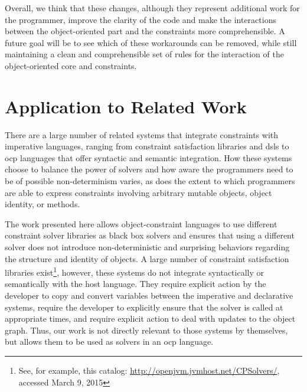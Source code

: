 \documentclass[10pt,reprint]{sigplanconf-preprint}
\def\ab#1{\todo[size=\footnotesize,color=red!40]{\textsf{AB: #1}}}
\def\tf#1{\todo[size=\footnotesize,color=purple!40]{\textsf{TF: #1}}}
\newcommand{\ac}[1]{\gls*{#1}}
\newcommand{\acp}[1]{\glspl*{#1}}
\begin{document}

\noindent\begin{center}
\baselineskip
\end{center}
\baselineskip

Overall, we think that these changes, although they represent
additional work for the programmer, improve the clarity of the code
and make the interactions between the object-oriented part and the
constraints more comprehensible. A future goal will be to see which of
these workarounds can be removed, while still maintaining a clean and
comprehensible set of rules for the interaction of the object-oriented
core and constraints.

\section{Application to Related Work}
\label{sec:related-work}

There are a large number of related systems that integrate constraints
with imperative languages, ranging from constraint satisfaction
libraries and \acp{dsl} to \acrlong{ocp} languages that offer
syntactic and semantic integration. How these systems choose to
balance the power of solvers and how aware the programmers need to be
of possible non-determinism varies, as does the extent to which
programmers are able to express constraints involving arbitrary
mutable objects, object identity, or methods.

The work presented here allows object-constraint languages to use
different constraint solver libraries as black box solvers and ensures
that using a different solver does not introduce non-deterministic and
surprising behaviors regarding the structure and identity of
objects. A large number of constraint satisfaction libraries
exist\footnote{See, for example, this catalog:
  \url{http://openjvm.jvmhost.net/CPSolvers/}, accessed March 9,
  2015}, however, these systems do not integrate syntactically or
semantically with the host language. They require explicit action by
the developer to copy and convert variables between the imperative and
declarative systems, require the developer to explicitly ensure that
the solver is called at appropriate times, and require explicit action
to deal with updates to the object graph. Thus, our work is not
directly relevant to those systems by themselves, but allows them to
be used as solvers in an \ac{ocp} language.
\end{document}
